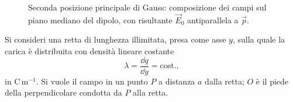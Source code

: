 \documentclass[main.tex]{subfiles}
\begin{document}
\begin{figure}[htbp]
	\caption{Seconda posizione principale di Gauss: composizione dei campi sul piano mediano del dipolo, con risultante $\vec{E}_0$ antiparallela a $\vec{p}$.}
	\label{fig:campo:dipolo_mediano_infografica}
\end{figure}

Si consideri una retta di lunghezza illimitata, presa come asse $y$, sulla quale la carica è distribuita con densità lineare costante
\[
\lambda=\frac{\dd q}{\dd y}=\text{cost.},
\]
in $\mathrm{C\,m^{-1}}$. Si vuole il campo in un punto $P$ a distanza $a$ dalla retta; $O$ è il piede della perpendicolare condotta da $P$ alla retta.
\end{document}

